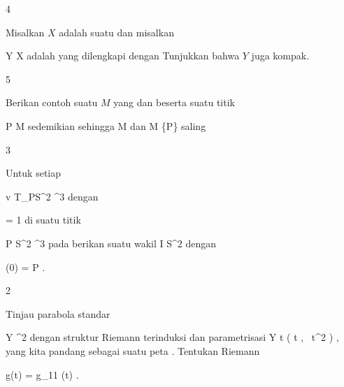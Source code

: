 {4}
{

Misalkan $X$ adalah suatu
dan misalkan

\mavergleichskette
{\vergleichskette
{Y
}
{ \subseteq }{ X
}
{  }{
}
{    }{
}
{   }{
}
}
{}{}{}
adalah
yang dilengkapi dengan
Tunjukkan bahwa $Y$ juga kompak.

}
{} {}

{5}
{

Berikan contoh suatu
$M$ yang
dan
beserta suatu titik

\mavergleichskette
{\vergleichskette
{ P
}
{ \in }{ M
}
{  }{
}
{    }{
}
{   }{
}
}
{}{}{}
sedemikian sehingga
\mathkor {} {M} {dan} {M \setminus \{P\}} {}
saling

}
{} {}

{3}
{

Untuk setiap

\mavergleichskette
{\vergleichskette
{ v
}
{ \in }{ T_PS^2
}
{ \subseteq }{ \R^3
}
{    }{
}
{   }{
}
}
{}{}{}
dengan

\mavergleichskette
{\vergleichskette
{  \Vert
}
{ = }{ 1
}
{  }{
}
{    }{
}
{   }{
}
}
{}{}{}
di suatu titik

\mavergleichskette
{\vergleichskette
{ P
}
{ \in }{ S^2
}
{ \subset }{ \R^3
}
{    }{
}
{   }{
}
}
{}{}{}
pada
berikan suatu wakil
\maabbdisp {\gamma} { I } { S^2
} {}
dengan

\mavergleichskette
{\vergleichskette
{ \gamma(0)
}
{ = }{ P
}
{  }{
}
{    }{
}
{   }{
}
}
{}{}{.}

}
{} {}

{2}
{

Tinjau parabola standar

\mavergleichskette
{\vergleichskette
{ Y
}
{ \subseteq }{ \R^2
}
{  }{
}
{    }{
}
{   }{
}
}
{}{}{}
dengan struktur Riemann terinduksi dan parametrisasi
\maabbeledisp {\varphi} {\R} { Y
} { t } { \left(  t   , \,  t^2                   \right)
} {,}
yang kita pandang sebagai suatu peta
 {} {}.
Tentukan
Riemann

\mavergleichskette
{\vergleichskette
{ g(t)
}
{ = }{ g_{11} (t)
}
{  }{
}
{    }{
}
{   }{
}
}
{}{}{.}

}
{} {}

